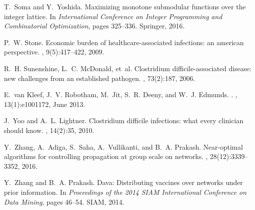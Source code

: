 \documentclass[10pt,letterpaper]{article}
\begin{document}
\begin{thebibliography}{}
T.~Soma and Y.~Yoshida.
\newblock Maximizing monotone submodular functions over the integer lattice.
\newblock In {\em International Conference on Integer Programming and
  Combinatorial Optimization}, pages 325--336. Springer, 2016.

P.~W. Stone.
\newblock Economic burden of healthcare-associated infections: an american
  perspective.
,
  9(5):417--422, 2009.

R.~H. Sunenshine, L.~C. McDonald, et~al.
\newblock Clostridium difficile-associated disease: new challenges from an
  established pathogen.
, 73(2):187, 2006.

E.~van Kleef, J.~V. Robotham, M.~Jit, S.~R. Deeny, and W.~J. Edmunds.
.
, 13(1):e1001172, June 2013.

J.~Yoo and A.~L. Lightner.
\newblock Clostridium difficile infections: what every clinician should know.
, 14(2):35, 2010.

Y.~Zhang, A.~Adiga, S.~Saha, A.~Vullikanti, and B.~A. Prakash.
\newblock Near-optimal algorithms for controlling propagation at group scale on
  networks.
,
  28(12):3339--3352, 2016.

Y.~Zhang and B.~A. Prakash.
\newblock Dava: Distributing vaccines over networks under prior information.
\newblock In {\em Proceedings of the 2014 SIAM International Conference on Data
  Mining}, pages 46--54. SIAM, 2014.


\end{thebibliography}

%
\end{document}
